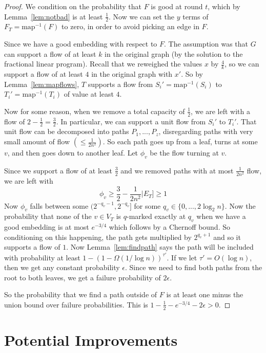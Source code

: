 \documentclass[12pt]{article}
\begin{document}
\begin{proof}
We condition on the probability that $F$ is good at round $t$, which by Lemma~\ref{lem:notbad} is at least $\frac{1}{2}$. Now we can set the $y$ terms of $F_T = \text{map}^{-1}(F)$ to zero, in order to avoid picking an edge in $F$. 

Since we have a good embedding with respect to $F$. The assumption was that $G$ can support a flow of at least $k$ in the original graph (by the solution to the fractional linear program). Recall that we reweighed the values $x$ by $\frac{4}{k}$, so we can support a flow of at least $4$ in the original graph with $x'$. So by Lemma~\ref{lem:mapflows}, $T$ supports a flow from $S_i' = \text{map}^{-1}(S_i)$ to $T_i' = \text{map}^{-1}(T_i)$ of value at least $4$. 

Now for some reason, when we remove a total capacity of $\frac{1}{2}$, we are left with a flow of $2 - \frac{1}{2} = \frac{3}{2}$. In particular, we can support a unit flow from $S_i'$ to $T_i'$. That unit flow can be decomposed into paths $P_1, ..., P_z$, disregarding paths with very small amount of flow $(\leq \frac{1}{2n^2})$. So each path goes up from a leaf, turns at some $v$, and then goes down to another leaf. Let $\phi_v$ be the flow turning at $v$. 

Since we support a flow of at least $\frac{3}{2}$ and we removed paths with at most $\frac{1}{2n^2}$ flow, we are left with
\[ \phi_v \geq \frac{3}{2} - \dfrac{1}{2n^2}|E_T] \geq 1 \]
Now $\phi_v$ falls between some $(2^{-q_v-1}, 2^{-q_v}]$ for some $q_v \in \{0, ..., 2\log_2 n\}$. Now the probability that none of the $v \in V_T$ is $q$-marked exactly at $q_v$ when we have a good embedding is at most $e^{-3/4}$ which follows by a Chernoff bound. So conditioning on this happening, the path gets multiplied by $2^{q_v+1}$ and so it supports a flow of $1$. Now Lemma~\ref{lem:findpath} says the path will be included with probability at least $1 - (1 - \Omega(1/\log n))^{\tau'}$. If we let $\tau' = O(\log n)$, then we get any constant probability $\epsilon$. Since we need to find both paths from the root to both leaves, we get a failure probability of $2\epsilon$.

So the probability that we find a path outside of $F$ is at least one minus the union bound over failure probabilities. This is $1 - \frac{1}{2} - e^{-3/4} - 2\epsilon > 0$. 
\end{proof}

\section{Potential Improvements}
\end{document}
